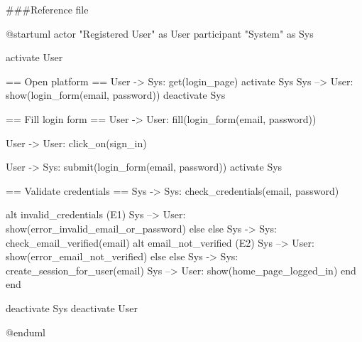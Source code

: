 ###Reference file

@startuml
actor "Registered User" as User
participant "System" as Sys

activate User

== Open platform ==
User -> Sys: get(login_page)
activate Sys
Sys --> User: show(login_form(email, password))
deactivate Sys

== Fill login form ==
User -> User: fill(login_form(email, password))

User -> User: click_on(sign_in)

User -> Sys: submit(login_form(email, password))
activate Sys

== Validate credentials ==
Sys -> Sys: check_credentials(email, password)

alt invalid_credentials (E1)
    Sys --> User: show(error_invalid_email_or_password)
else else
    Sys -> Sys: check_email_verified(email)
    alt email_not_verified (E2)
        Sys --> User: show(error_email_not_verified)
    else else
        Sys -> Sys: create_session_for_user(email)
        Sys --> User: show(home_page_logged_in)
    end
end

deactivate Sys
deactivate User

@enduml